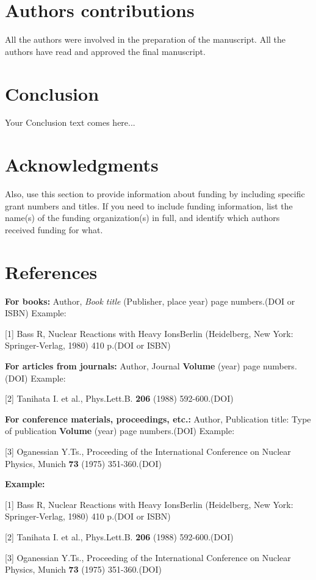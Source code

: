 \documentclass[12pt,a4paper,twoside]{article}
\begin{document}
\section*{Authors contributions}


All the authors were involved in the preparation of the manuscript. All the authors have read and approved the final manuscript.

\section*{Conclusion}

Your Conclusion text comes here...

\section*{Acknowledgments }


Also, use this section to provide information about funding by including specific grant numbers and titles. If you need to include funding information, list the name(s) of the funding organization(s) in full, and identify which authors received funding for what.

\section*{References }

\textbf{For books: }
Author, \textit{Book title} (Publisher, place year) page numbers.(DOI or ISBN) Example:

[1]	Bass R, Nuclear Reactions with Heavy IonsBerlin (Heidelberg, New York: Springer-Verlag, 1980) 410 p.(DOI or ISBN)

\textbf{For articles from journals:}
Author, Journal \textbf{Volume} (year) page numbers.(DOI) Example:

[2] Tanihata I. et al., Phys.Lett.B. \textbf{206} (1988) 592-600.(DOI)

\textbf{For conference materials, proceedings, etc.:}
Author, Publication title: Type of publication \textbf{Volume} (year) page numbers.(DOI) Example:

[3] Oganessian Y.Ts., Proceeding of the International Conference on Nuclear Physics, Munich \textbf{73} (1975) 351-360.(DOI)

\begin{flushleft}
\textbf{Example: }


[1] Bass R, Nuclear Reactions with Heavy IonsBerlin (Heidelberg, New York: Springer-Verlag, 1980) 410 p.(DOI or ISBN)

[2] Tanihata I. et al., Phys.Lett.B. \textbf{206} (1988) 592-600.(DOI)

[3] Oganessian Y.Ts., Proceeding of the International Conference on Nuclear Physics, Munich \textbf{73} (1975) 351-360.(DOI)

\end{flushleft}
\end{document}
